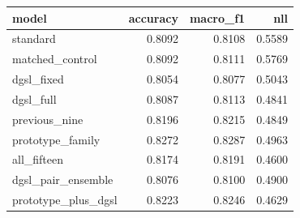 \begin{tabular}{lrrr}
\toprule
model & accuracy & macro\_f1 & nll \\
\midrule
standard & 0.8092 & 0.8108 & 0.5589 \\
matched\_control & 0.8092 & 0.8111 & 0.5769 \\
dgsl\_fixed & 0.8054 & 0.8077 & 0.5043 \\
dgsl\_full & 0.8087 & 0.8113 & 0.4841 \\
previous\_nine & 0.8196 & 0.8215 & 0.4849 \\
prototype\_family & 0.8272 & 0.8287 & 0.4963 \\
all\_fifteen & 0.8174 & 0.8191 & 0.4600 \\
dgsl\_pair\_ensemble & 0.8076 & 0.8100 & 0.4900 \\
prototype\_plus\_dgsl & 0.8223 & 0.8246 & 0.4629 \\
\bottomrule
\end{tabular}
